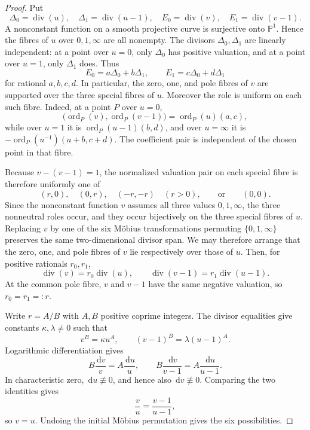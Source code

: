 \documentclass[11pt]{article}
\numberwithin{equation}{section}
\theoremstyle{definition}
\newcommand{\ord}{\operatorname{ord}}
\newcommand{\dd}{\,\mathrm d}
\begin{document}
\begin{proof}
Put
\[
 \Delta_0=\operatorname{div}(u),\quad
 \Delta_1=\operatorname{div}(u-1),\quad
 E_0=\operatorname{div}(v),\quad
 E_1=\operatorname{div}(v-1).
\]
A nonconstant function on a smooth projective curve is surjective onto
\(\mathbb P^1\).  Hence the fibres of \(u\) over \(0,1,\infty\) are all
nonempty.  The divisors \(\Delta_0,\Delta_1\) are linearly independent:
at a point over \(u=0\), only \(\Delta_0\) has positive valuation, and at
a point over \(u=1\), only \(\Delta_1\) does.  Thus
\[
 E_0=a\Delta_0+b\Delta_1,
 \qquad
 E_1=c\Delta_0+d\Delta_1
\]
for rational \(a,b,c,d\).  In particular, the zero, one, and pole fibres of
\(v\) are supported over the three special fibres of \(u\).  Moreover the
role is uniform on each such fibre.  Indeed, at a point \(P\) over \(u=0\),
\[
 \bigl(\ord_P(v),\ord_P(v-1)\bigr)
 =\ord_P(u)(a,c),
\]
while over \(u=1\) it is \(\ord_P(u-1)(b,d)\), and over \(u=\infty\) it is
\(-\ord_P(u^{-1})(a+b,c+d)\).  The coefficient pair is independent of the
chosen point in that fibre.

Because \(v-(v-1)=1\), the normalized valuation pair on each special fibre
is therefore uniformly one of
\[
 (r,0),\quad(0,r),\quad(-r,-r)\quad(r>0),
 \qquad\text{or}\qquad(0,0).
\]
Since the nonconstant function \(v\) assumes all three values
\(0,1,\infty\), the three nonneutral roles occur, and they occur
bijectively on the three special fibres of \(u\).  Replacing \(v\) by one
of the six Möbius transformations permuting \(\{0,1,\infty\}\) preserves
the same two-dimensional divisor span.  We may therefore arrange that the
zero, one, and pole fibres of \(v\) lie respectively over those of \(u\).
Then, for positive rationals \(r_0,r_1\),
\[
 \operatorname{div}(v)=r_0\operatorname{div}(u),
 \qquad
 \operatorname{div}(v-1)=r_1\operatorname{div}(u-1).
\]
At the common pole fibre, \(v\) and \(v-1\) have the same negative
valuation, so \(r_0=r_1=:r\).

Write \(r=A/B\) with \(A,B\) positive coprime integers.  The divisor
equalities give constants \(\kappa,\lambda\neq0\) such that
\[
 v^B=\kappa u^A,
 \qquad
 (v-1)^B=\lambda(u-1)^A.
\]
Logarithmic differentiation gives
\[
 B\frac{\dd v}{v}=A\frac{\dd u}{u},
 \qquad
 B\frac{\dd v}{v-1}=A\frac{\dd u}{u-1}.
\]
In characteristic zero, \(\dd u\not\equiv0\), and hence also
\(\dd v\not\equiv0\).  Comparing the two identities gives
\[
 \frac vu=\frac{v-1}{u-1},
\]
so \(v=u\).  Undoing the initial Möbius permutation gives the six
possibilities.
\end{proof}
\end{document}
